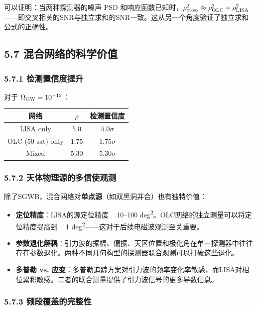 \documentclass[12pt,a4paper]{article}
\begin{document}
可以证明：当两种探测器的噪声 PSD 和响应函数已知时，$\rho_{\rm cross}^2 \approx \rho_{\rm OLC}^2 + \rho_{\rm LISA}^2$——即交叉相关的SNR与独立求和的SNR一致。这从另一个角度验证了独立求和公式的正确性。

\subsection{5.7 混合网络的科学价值}


\subsubsection{5.7.1 检测置信度提升}


对于 $\Omega_{\rm GW} = 10^{-12}$：

\begin{tabular}{|c|c|c|}
\hline
网络 & $\rho$ & 检测置信度 \\
\hline
LISA only & 5.0 & $5.0\sigma$ \\
OLC (50 sat) only & 1.75 & $1.75\sigma$ \\
Mixed & 5.30 & $5.30\sigma$ \\
\hline
\end{tabular}


\subsubsection{5.7.2 天体物理源的多信使观测}


除了SGWB，混合网络对\textbf{单点源}（如双黑洞并合）也有独特价值：

\begin{itemize}
  \item[1] \textbf{定位精度}：LISA的源定位精度 ~ 10–100 deg\textsuperscript{2}。OLC网络的独立测量可以将定位精度提高到 ~ 1 deg\textsuperscript{2}——这对于后续电磁波观测至关重要。

  \item[2] \textbf{参数退化解耦}：引力波的振幅、偏振、天区位置和极化角在单一探测器中往往存在参数退化。两种不同几何构型的探测器联合观测可以打破这些退化。

  \item[3] \textbf{多普勒 vs. 应变}：多普勒追踪方案对引力波的频率变化率敏感，而LISA对相位累积敏感。二者的联合测量提供了引力波信号的更多导数信息。

\end{itemize}
\subsubsection{5.7.3 频段覆盖的完整性}
\end{document}
